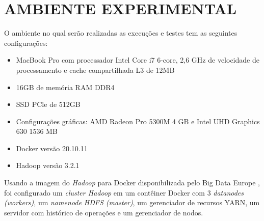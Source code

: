 \section{AMBIENTE EXPERIMENTAL} \label{sec:ambienteexperimental}

O ambiente no qual serão realizadas as execuções e testes tem as seguintes configurações: 
\begin{itemize}
    \item MacBook Pro com processador Intel Core i7 6-core, 2,6 GHz de velocidade de processamento e cache compartilhada L3 de 12MB
    \item 16GB de memória RAM DDR4
    \item SSD PCle de 512GB
    \item Configurações gráficas: AMD Radeon Pro 5300M 4 GB e Intel UHD Graphics 630 1536 MB
    \item Docker versão 20.10.11
    \item Hadoop versão 3.2.1
\end{itemize}

Usando a imagem do \textit{Hadoop} para Docker disponibilizada pelo Big Data Europe \cite{BigDataHadoopGithub}, foi configurado um \textit{cluster Hadoop} em um contêiner Docker com 3 \textit{datanodes (workers)}, um \textit{namenode HDFS (master)}, um gerenciador de recursos YARN, um servidor com histórico de operações e um gerenciador de nodos.